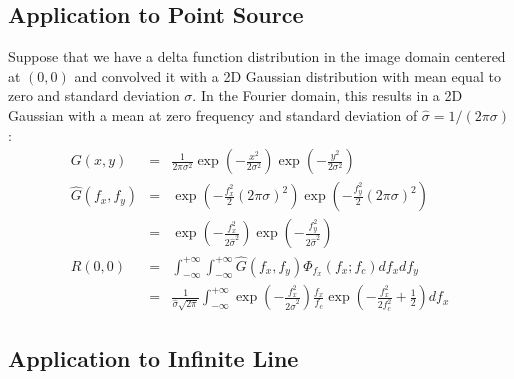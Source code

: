 \documentclass{article}
\begin{document}
\subsection{Application to Point Source}
Suppose that we have a delta function distribution in the image domain centered at $ (0,0) $ and convolved it with a 2D Gaussian distribution with mean equal to zero and standard deviation $ \sigma $. In the Fourier domain, this results in a 2D Gaussian with a mean at zero frequency and standard deviation of $ \hat{\sigma} = 1/(2\pi\sigma) $:
\begin{eqnarray}
    G(x,y) & = & \frac{1}{2\pi\sigma^2} \exp(-\frac{x^2}{2\sigma^2})  \exp(-\frac{y^2}{2\sigma^2}) \\
    \widehat{G}(f_x,f_y) & = & \exp(-\frac{f_x^2}{2}(2\pi\sigma)^2)  \exp(-\frac{f_y^2}{2}(2\pi\sigma)^2)\\
    & = & \exp(-\frac{f_x^2}{2\hat{\sigma}^2})  \exp(-\frac{f_y^2}{2\hat{\sigma}^2}) \\
    R(0,0) & = & \int_{-\infty}^{+\infty} \int_{-\infty}^{+\infty} \widehat{G}(f_x,f_y) \Phi_{f_x}(f_x; f_c) df_x df_y \\
    & = & \frac{1}{\hat{\sigma}\sqrt{2\pi}} \int_{-\infty}^{+\infty} \exp(-\frac{f_x^2}{2\hat{\sigma}^2})  \frac{f_x}{f_c} \exp(-\frac{f_x^2}{2f_c^2}+\frac{1}{2}) df_x 
\end{eqnarray}
\subsection{Application to Infinite Line}
\end{document}
